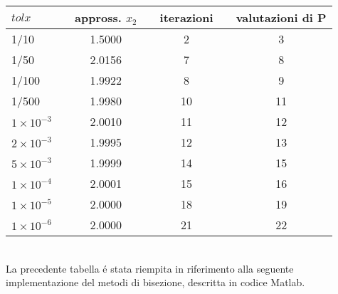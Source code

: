\begin{tabular}{l*{6}{c}}
 \(tolx\) &\vline& appross. \(x_2\) &\vline& iterazioni &\vline& valutazioni di P\\
\hline
 1/10 &\vline& 1.5000 &\vline& 2 &\vline& 3\\
 1/50 &\vline& 2.0156 &\vline& 7 &\vline& 8\\
 1/100 &\vline& 1.9922 &\vline& 8 &\vline& 9\\
 1/500 &\vline& 1.9980 &\vline& 10 &\vline& 11\\
 \(1 \times 10^{-3}\) &\vline& 2.0010 &\vline& 11 &\vline& 12\\
 \(2 \times 10^{-3}\) &\vline& 1.9995 &\vline& 12 &\vline& 13\\
 \(5 \times 10^{-3}\) &\vline& 1.9999 &\vline& 14 &\vline& 15\\
 \(1 \times 10^{-4}\) &\vline& 2.0001 &\vline& 15 &\vline& 16\\
 \(1 \times 10^{-5}\) &\vline& 2.0000 &\vline& 18 &\vline& 19\\
 \(1 \times 10^{-6}\) &\vline& 2.0000 &\vline& 21 &\vline& 22\\
\end{tabular} \\

\noindent La precedente tabella \'e stata riempita in riferimento alla seguente implementazione del metodi di bisezione, descritta in codice Matlab.\\


